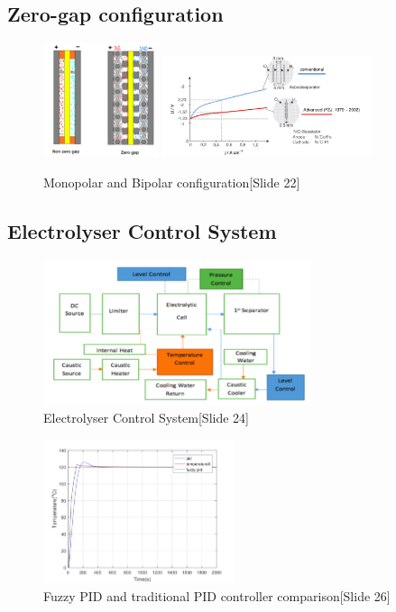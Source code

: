 \subsection{Zero-gap configuration}
\begin{figure}[H]
\includegraphics[width=0.30\textwidth]{zerogap.png}
\includegraphics[width=0.55\textwidth]{zerogapgap.png}
\caption{Monopolar and Bipolar configuration[Slide 22]} 
\end{figure} 

\subsection{Electrolyser Control System}
\begin{figure}[H]
\centering
\includegraphics[width=0.70\textwidth]{controlcontrol.png}
\caption{Electrolyser Control System[Slide 24]} 
\end{figure}
\begin{figure}[H]
\includegraphics[width=0.50\textwidth]{pidpid.png}
\caption{Fuzzy PID and traditional PID controller comparison[Slide 26]} 
\end{figure} 






